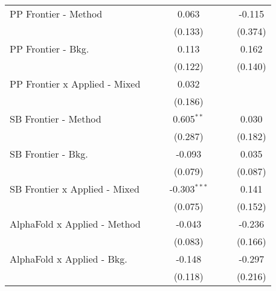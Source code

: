\begin{tabular}{lcccccc}
   PP Frontier - Method           &               &              & 0.063          &               &              & -0.115\\   
                                  &               &              & (0.133)        &               &              & (0.374)\\   
   PP Frontier - Bkg.             &               &              & 0.113          &               &              & 0.162\\   
                                  &               &              & (0.122)        &               &              & (0.140)\\   
   PP Frontier x Applied - Mixed  &               &              & 0.032          &               &              &   \\   
                                  &               &              & (0.186)        &               &              &   \\   
   SB Frontier - Method           &               &              & 0.605$^{**}$   &               &              & 0.030\\   
                                  &               &              & (0.287)        &               &              & (0.182)\\   
   SB Frontier - Bkg.             &               &              & -0.093         &               &              & 0.035\\   
                                  &               &              & (0.079)        &               &              & (0.087)\\   
   SB Frontier x Applied - Mixed  &               &              & -0.303$^{***}$ &               &              & 0.141\\   
                                  &               &              & (0.075)        &               &              & (0.152)\\   
   AlphaFold x Applied - Method   &               &              & -0.043         &               &              & -0.236\\   
                                  &               &              & (0.083)        &               &              & (0.166)\\   
   AlphaFold x Applied - Bkg.     &               &              & -0.148         &               &              & -0.297\\   
                                  &               &              & (0.118)        &               &              & (0.216)\\   

\end{tabular}
